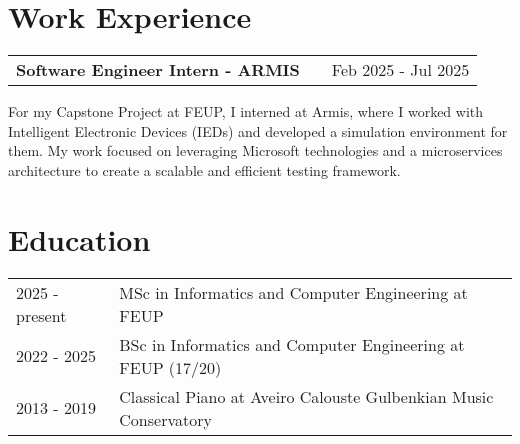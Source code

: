 \documentclass[a4paper,12pt]{article}
\makeatletter
\newenvironment{jobshort}[2]
    {
    \begin{tabularx}{\linewidth}{@{}l X r@{}}
    \textbf{#1} & \hfill &  #2 \\[3.75pt]
    \end{tabularx}
    }
    {
    }
\makeatother
\begin{document}
\section{Work Experience}

\begin{jobshort}{Software Engineer  Intern - ARMIS}{Feb 2025 - Jul 2025}
For my Capstone Project at FEUP, I interned at Armis, where I worked with Intelligent Electronic Devices (IEDs) and developed a simulation environment for them. My work focused on leveraging Microsoft technologies and a microservices architecture to create a scalable and efficient testing framework.
\end{jobshort}
  


\section{Education}
\begin{tabularx}{\linewidth}{@{}l X@{}}	
2025 - present & MSc in Informatics and Computer Engineering at FEUP \hfill \\

2022 - 2025 & BSc in Informatics and Computer Engineering at FEUP \hfill (17/20) \\ 

2013 - 2019 & Classical Piano at Aveiro Calouste Gulbenkian Music Conservatory \hfill \\ 

\end{tabularx}
\end{document}
